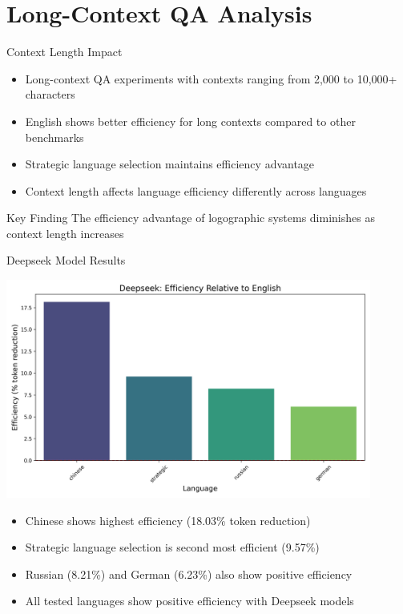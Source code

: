 \documentclass{beamer}
\begin{document}
\section{Long-Context QA Analysis}

\begin{frame}{Context Length Impact}
    \begin{itemize}
        \item Long-context QA experiments with contexts ranging from 2,000 to 10,000+ characters
        \item English shows better efficiency for long contexts compared to other benchmarks
        \item Strategic language selection maintains efficiency advantage
        \item Context length affects language efficiency differently across languages
    \end{itemize}
    
    \begin{block}{Key Finding}
        The efficiency advantage of logographic systems diminishes as context length increases
    \end{block}
\end{frame}

\begin{frame}{Deepseek Model Results}
    \begin{center}
        \includegraphics[width=0.9\textwidth]{visualizations/deepseek/deepseek_efficiency.png}
    \end{center}
    
    \begin{itemize}
        \item Chinese shows highest efficiency (18.03\% token reduction)
        \item Strategic language selection is second most efficient (9.57\%)
        \item Russian (8.21\%) and German (6.23\%) also show positive efficiency
        \item All tested languages show positive efficiency with Deepseek models
    \end{itemize}
\end{frame}
\end{document}
